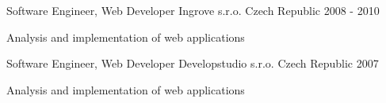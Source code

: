 \begin{cventries}
\cventry
{Software Engineer, Web Developer} %
{Ingrove s.r.o.} %
{Czech Republic} %
{2008 - 2010} %
{
	\begin{cvitems} %
		\item {Analysis and implementation of web applications %
		}
	\end{cvitems}
}

\cventry
{Software Engineer, Web Developer} %
{Developstudio s.r.o.} %
{Czech Republic} %
{2007} %
{
	\begin{cvitems} %
		\item {Analysis and implementation of web applications %
		}
	\end{cvitems}
}

\end{cventries}
